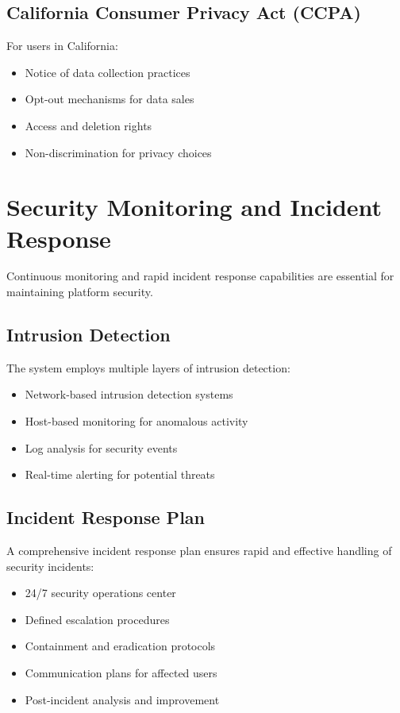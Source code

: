 \documentclass[12pt,a4paper]{report}
\begin{document}
\subsection{California Consumer Privacy Act (CCPA)}
For users in California:
\begin{itemize}[leftmargin=2em]
  \item Notice of data collection practices
  \item Opt-out mechanisms for data sales
  \item Access and deletion rights
  \item Non-discrimination for privacy choices
\end{itemize}

\section{Security Monitoring and Incident Response}
Continuous monitoring and rapid incident response capabilities are essential for maintaining platform security.

\subsection{Intrusion Detection}
The system employs multiple layers of intrusion detection:
\begin{itemize}[leftmargin=2em]
  \item Network-based intrusion detection systems
  \item Host-based monitoring for anomalous activity
  \item Log analysis for security events
  \item Real-time alerting for potential threats
\end{itemize}

\subsection{Incident Response Plan}
A comprehensive incident response plan ensures rapid and effective handling of security incidents:
\begin{itemize}[leftmargin=2em]
  \item 24/7 security operations center
  \item Defined escalation procedures
  \item Containment and eradication protocols
  \item Communication plans for affected users
  \item Post-incident analysis and improvement
\end{itemize}
\end{document}
